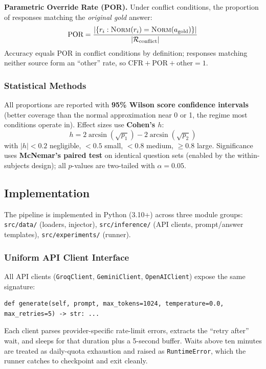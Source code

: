 \textbf{Parametric Override Rate (POR).} Under conflict conditions, the proportion of responses matching the \emph{original gold} answer:
\begin{equation}
    \text{POR} = \frac{|\{r_i : \textsc{Norm}(r_i) = \textsc{Norm}(a_{\text{gold}})\}|}{|\mathcal{R}_{\text{conflict}}|}
\end{equation}
Accuracy equals POR in conflict conditions by definition; responses matching neither source form an ``other'' rate, so $\text{CFR} + \text{POR} + \text{other} = 1$.

\subsubsection{Statistical Methods}

All proportions are reported with \textbf{95\% Wilson score confidence intervals} (better coverage than the normal approximation near 0 or 1, the regime most conditions operate in). Effect sizes use \textbf{Cohen's $h$}:
\begin{equation}
    h = 2 \arcsin(\sqrt{p_1}) - 2 \arcsin(\sqrt{p_2})
\end{equation}
with $|h|<0.2$ negligible, $<0.5$ small, $<0.8$ medium, $\geq 0.8$ large. Significance uses \textbf{McNemar's paired test} on identical question sets (enabled by the within-subjects design); all $p$-values are two-tailed with $\alpha = 0.05$.

\subsection{Implementation}
\label{sec:implementation}

The pipeline is implemented in Python (3.10+) across three module groups: \texttt{src/data/} (loaders, injector), \texttt{src/inference/} (API clients, prompt/answer templates), \texttt{src/experiments/} (runner).

\subsubsection{Uniform API Client Interface}

All API clients (\texttt{GroqClient}, \texttt{GeminiClient}, \texttt{OpenAIClient}) expose the same signature:
\begin{lstlisting}[caption={Shared API-client interface. Provider-specific rate-limit parsing and exponential back-off are hidden behind this uniform signature, making the experiment runner model-agnostic.}, label={lst:api}]
def generate(self, prompt, max_tokens=1024, temperature=0.0, max_retries=5) -> str: ...
\end{lstlisting}
Each client parses provider-specific rate-limit errors, extracts the ``retry after'' wait, and sleeps for that duration plus a 5-second buffer. Waits above ten minutes are treated as daily-quota exhaustion and raised as \texttt{RuntimeError}, which the runner catches to checkpoint and exit cleanly.

